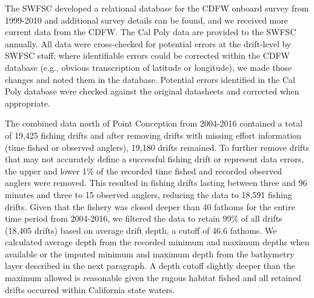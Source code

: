 \documentclass[
  authoryear,
  preprint,
  3p]{elsarticle}
\begin{document}
The SWFSC developed a relational database for the CDFW onboard survey
from 1999-2010 and additional survey details can be
found\citeyearpar{Monk:2014:DRD}, and we received more current data from
the CDFW. The Cal Poly data are provided to the SWFSC annually. All data
were cross-checked for potential errors at the drift-level by SWFSC
staff; where identifiable errors could be corrected within the CDFW
database (e.g., obvious transcription of latitude or longitude), we made
those changes and noted them in the database. Potential errors
identified in the Cal Poly database were checked against the original
datasheets and corrected when appropriate.

The combined data north of Point Conception from 2004-2016 contained a
total of 19,425 fishing drifts and after removing drifts with missing
effort information (time fished or observed anglers), 19,180 drifts
remained. To further remove drifts that may not accurately define a
successful fishing drift or represent data errors, the upper and lower
1\% of the recorded time fished and recorded observed anglers were
removed. This resulted in fishing drifts lasting between three and 96
minutes and three to 15 observed anglers, reducing the data to 18,591
fishing drifts. Given that the fishery was closed deeper than 40 fathoms
for the entire time period from 2004-2016, we filtered the data to
retain 99\% of all drifts (18,405 drifts) based on average drift depth,
a cutoff of 46.6 fathoms. We calculated average depth from the recorded
minimum and maximum depths when available or the imputed minimum and
maximum depth from the bathymetry layer described in the next paragraph.
A depth cutoff slightly deeper than the maximum allowed is reasonable
given the rugous habitat fished and all retained drifts occurred within
California state waters.
\end{document}

